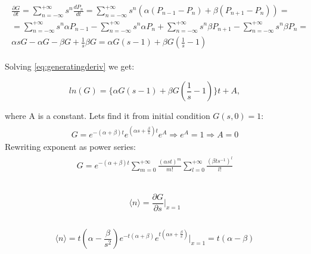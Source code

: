 \documentclass[10pt]{article}
\begin{document}
\begin{align}
\begin{split}
\frac{\partial G}{\partial t} = \sum_{n=-\infty}^{+\infty} s^n \frac{d P_n}{dt} = \sum_{n=-\infty}^{+\infty} s^n (\alpha(P_{n-1} - P_n) +\beta(P_{n+1} - P_n)) = \\
= \sum_{n=-\infty}^{+\infty} s^n \alpha P_{n-1} - \sum_{n=-\infty}^{+\infty} s^n \alpha P_{n} + \sum_{n=-\infty}^{+\infty} s^n \beta P_{n+1} - \sum_{n=-\infty}^{+\infty} s^n \beta P_{n} = \\
\alpha s G - \alpha G - \beta G + \frac{1}{s}\beta G = \alpha G(s-1) + \beta G(\frac{1}{s} - 1)
\label{eq:generatingderiv}
\end{split}
\end{align}

Solving \ref{eq:generatingderiv} we get:

\begin{equation}
ln(G) = \big\{\alpha G(s-1) + \beta G(\frac{1}{s} - 1)\big\}t + A,
\end{equation}

where A is a constant. Lets find it from initial condition $G(s,0)=1$:
\begin{align}
\begin{split}
G = e^{ -(\alpha + \beta) t} e^{ (\alpha s + \frac{\beta}{s})t} e^A \Rightarrow e^A=1 \Rightarrow A=0
\label{eq:incond}
\end{split}
\end{align}
Rewriting exponent as power series:
\begin{align}
\begin{split}
G = e^{ -(\alpha + \beta) t} \sum_{m=0}^{+\infty} \frac{(\alpha s t)^m}{m!} \sum_{l=0}^{+\infty} \frac{(\beta t s^{-1})^l}{l!}
\label{eq:razloj}
\end{split}
\end{align}

\subsection{}
\begin{equation}
\langle n\rangle = \frac{\partial G}{\partial s} \Bigg|_{x=1}
\end{equation}

\subsection{}
\begin{equation}
\langle n\rangle = t(\alpha - \frac{\beta}{s^2})e^{-t(\alpha + \beta)} e^{t(\alpha s + \frac{\beta}{s})} \Bigg|_{x=1} = t(\alpha - \beta)
\end{equation}
\end{document}
